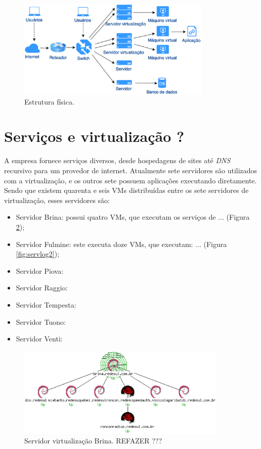 \begin{figure}[servfisicos]
 \centering
 \includegraphics[width=350px]{img/servfisicos.eps}
 \caption{Estrutura física.}
 \label{fig:servfisicos}
\end{figure}

\section{Serviços e virtualização ?}
\label{section:servicos}

A empresa fornece serviços diversos, desde hospedagens de sites até \textit{DNS} recursivo para um provedor de internet. 
Atualmente sete servidores são utilizados com a virtualização, e os outros sete possuem aplicações executando diretamente. 
Sendo que existem quarenta e seis \ac{VM}s distribuídas entre os sete servidores de virtualização, esses servidores são:
\begin{itemize}
 \item Servidor Brina: possui quatro \ac{VM}s, que executam os serviços de ... (Figura \ref{fig:servlog1});
 \item Servidor Fulmine: este executa doze \ac{VM}s, que executam: ... (Figura \ref{fig:servlog2});
 \item Servidor Piova: 
 \item Servidor Raggio: 
 \item Servidor Tempesta: 
 \item Servidor Tuono: 
 \item Servidor Venti: 
\end{itemize}

\begin{figure}[servlog1]
 \centering
 \includegraphics[width=380px]{img/servlog1.eps}
 \caption{Servidor virtualização Brina. REFAZER ???}
 \label{fig:servlog1}
\end{figure}

